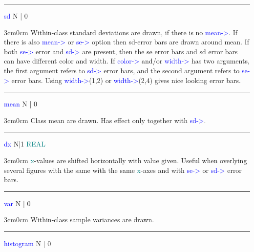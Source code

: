 \vspace{0.3cm} 
\hrule 
\vspace{0.3cm} 
\noindent \textcolor{blue}{sd}  \tabto{3cm}  N | 0  \tabto{5cm}    \tabto{7cm} 
\begin{changemargin}{3cm}{0cm} 
\noindent  Within-class standard deviations are drawn, if there is no \textcolor{blue}{mean->}. 
If there is also \textcolor{blue}{mean->} or \textcolor{blue}{se->} option then sd-error bars are drawn 
around mean. If both \textcolor{blue}{se->} error and \textcolor{blue}{sd->} are present, then the se error bars and 
sd error bars can have different color and width. If \textcolor{blue}{color->} and/or \textcolor{blue}{width->} has two 
arguments, the first argument refers to \textcolor{blue}{sd->} error bars, and the second argument refers to 
\textcolor{blue}{se->} error bars. Using \textcolor{blue}{width->}(1,2) or \textcolor{blue}{width->}(2,4) gives nice looking error bars. 
 
 
\end{changemargin} 
\vspace{0.3cm} 
\hrule 
\vspace{0.3cm} 
\noindent \textcolor{blue}{mean}  \tabto{3cm}  N | 0  \tabto{5cm}    \tabto{7cm} 
\begin{changemargin}{3cm}{0cm} 
\noindent  Class mean are drawn. Has effect only together with \textcolor{blue}{sd->}. 
\end{changemargin} 
\vspace{0.3cm} 
\hrule 
\vspace{0.3cm} 
\noindent \textcolor{blue}{dx}  \tabto{3cm} N|1  \tabto{5cm}  \textcolor{teal}{REAL} \tabto{7cm} 
\begin{changemargin}{3cm}{0cm} 
\noindent  \textcolor{teal}{x}-values are shifted horizontally with value given. Useful when overlying several figures with the same 
with the same \textcolor{teal}{x}-axes and with \textcolor{blue}{se->} or \textcolor{blue}{sd->} error bars. 
\end{changemargin} 
\vspace{0.3cm} 
\hrule 
\vspace{0.3cm} 
\noindent \textcolor{blue}{var}  \tabto{3cm}  N | 0  \tabto{5cm}     \tabto{7cm} 
\begin{changemargin}{3cm}{0cm} 
\noindent Within-class sample variances are drawn. 
\end{changemargin} 
\vspace{0.3cm} 
\hrule 
\vspace{0.3cm} 
\noindent \textcolor{blue}{histogram}  \tabto{3cm}   N | 0  \tabto{5cm}     \tabto{7cm} 
